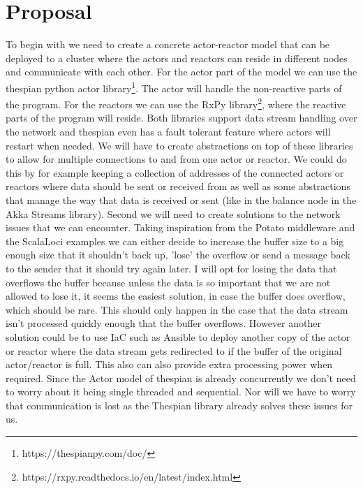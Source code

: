 \documentclass[a4paper]{article}
\begin{document}
\section*{Proposal}
To begin with we need to create a concrete actor-reactor model that can be deployed to a cluster where the actors and reactors can reside in different nodes and communicate with each other. For the actor part of the model we can use the thespian python actor library\footnote{https://thespianpy.com/doc/}. The actor will handle the non-reactive parts of the program. For the reactors we can use the RxPy library\footnote{https://rxpy.readthedocs.io/en/latest/index.html}, where the reactive parts of the program will reside. Both libraries support data stream handling over the network and thespian even has a fault tolerant feature where actors will restart when needed. We will have to create abstractions on top of these libraries to allow for multiple connections to and from one actor or reactor. We could do this by for example keeping a collection of addresses of the connected actors or reactors where data should be sent or received from as well as some abstractions that manage the way that data is received or sent (like in the balance node in the Akka Streams library). \newline\newline
Second we will need to create solutions to the network issues that we can encounter. Taking inspiration from the Potato middleware and the ScalaLoci examples we can either decide to increase the buffer size to a big enough size that it shouldn't back up, 'lose' the overflow or send a message back to the sender that it should try again later. I will opt for losing the data that overflows the buffer because unless the data is so important that we are not allowed to lose it, it seems the easiest solution, in case the buffer does overflow, which should be rare. This should only happen in the case that the data stream isn't processed quickly enough that the buffer overflows. However another solution could be to use IaC such as Ansible to deploy another copy of the actor or reactor where the data stream gets redirected to if the buffer of the original actor/reactor is full. This also can also provide extra processing power when required. Since the Actor model of thespian is already concurrently we don't need to worry about it being single threaded and sequential. Nor will we have to worry that communication is lost as the Thespian library already solves these issues for us. \newline\newline
\end{document}
